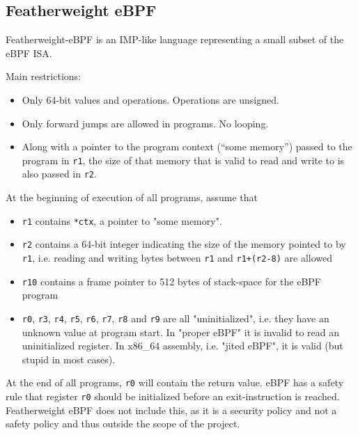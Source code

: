 \subsection{Featherweight eBPF}
\label{subsec:featherweight_ebpf}
Featherweight-eBPF is an IMP-like language representing a small subset of the eBPF ISA.

Main restrictions:
\begin{itemize}
\item Only 64-bit values and operations. Operations are unsigned. 
  \item Only forward jumps are allowed in programs. No looping.
\item Along with a pointer to the program context (``some memory'') passed to the program in \texttt{r1}, the size of that memory that is valid to read and write to is also passed in \texttt{r2}. 
\end{itemize}


At the beginning of execution of all programs, assume that
\begin{itemize}
\item \texttt{r1} contains \texttt{*ctx}, a pointer to "some memory".
\item \texttt{r2} contains a 64-bit integer indicating the size of the memory pointed to by \texttt{r1}, i.e. reading and writing bytes between \texttt{r1} and \texttt{r1+(r2-8)} are allowed
\item \texttt{r10} contains a frame pointer to 512 bytes of stack-space for the eBPF program
\item \texttt{r0}, \texttt{r3}, \texttt{r4}, \texttt{r5}, \texttt{r6}, \texttt{r7}, \texttt{r8} and \texttt{r9} are all "uninitialized", i.e. they have an unknown value at program start. In "proper eBPF" it is invalid to read an uninitialized register. In x86\_64 assembly, i.e. "jited eBPF", it is valid (but stupid in most cases).

\end{itemize}

At the end of all programs, \texttt{r0} will contain the return value. 
eBPF has a safety rule that register \texttt{r0} should be initialized before an exit-instruction is reached. Featherweight eBPF does not include this, as it is a security policy and not a safety policy and thus outside the scope of the project. 


